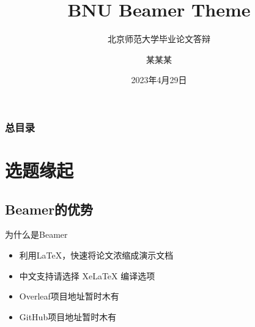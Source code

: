 \documentclass{beamer}
\author[Yuxuan Liu]{某某某}
\title{BNU Beamer Theme}
\subtitle{北京师范大学毕业论文答辩}
\institute[北京师范大学 文学院]{文学院\\语言学及应用语言学研究所}
\date{2023年4月29日}
\begin{document}


\begin{frame}
    \titlepage
\end{frame}

\begin{frame}
    \frametitle{总目录}
    \begin{multicols}{2}
     \tableofcontents[hideallsubsections]
    \end{multicols}
\end{frame}

\section{选题缘起}
\subsection{Beamer的优势}
\begin{frame}{为什么是Beamer}
    \begin{itemize}[<+-| alert@+>] %
        \item 利用\LaTeX{}，快速将论文浓缩成演示文档
        \item 中文支持请选择 Xe\LaTeX{} 编译选项 
        \item Overleaf项目地址暂时木有
        \item GitHub项目地址暂时木有
    \end{itemize}
\end{frame}
\end{document}
